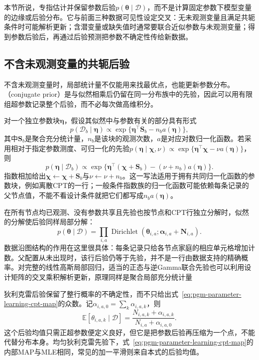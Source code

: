 本节所说，专指估计并保留参数后验$p(\bm{\theta}\mid\mathcal{D})$，而不是计算固定参数下模型变量的边缘或后验分布。它与前面三种数据可见性设定交叉：无未观测变量且满足共轭条件时可能解析更新；含潜变量或缺失值时通常要联合近似参数与未观测变量；得到参数后验后，再通过后验预测把参数不确定性传给新数据。

\subsection{不含未观测变量的共轭后验}
\label{sec:pgm-parameter-learning-conjugacy}

不含未观测变量时，局部统计量不仅能用来找最优点，也能更新参数分布。（conjugate prior）是与似然相乘后仍留在同一分布族中的先验，因此可以用有限组超参数记录整个后验，而不必每次做高维积分。

对一个独立参数块$\bm{\eta}$，假设其似然中与参数有关的部分具有形式
\[
  p(\mathcal{D}_b\mid\bm{\eta})
  \propto\exp\{\bm{\eta}^\top\bm{S}_b-n_ba(\bm{\eta})\},
\]
其中$\bm{S}_b$是聚合充分统计量，$n_b$是该块的观测次数，$a$是对应对数归一化函数。若采用相对于指定参数测度、可归一化的先验$p(\bm{\eta}\mid\bm{\chi},\nu)\propto\exp\{\bm{\eta}^\top\bm{\chi}-\nu a(\bm{\eta})\}$，则
\begin{equation}
  p(\bm{\eta}\mid\mathcal{D}_b)
  \propto
  \exp\{\bm{\eta}^\top(\bm{\chi}+\bm{S}_b)
                 -(\nu+n_b)a(\bm{\eta})\}.
  \label{eq:pgm-parameter-learning-conjugate-update}
\end{equation}
指数相加给出$\bm{\chi}\leftarrow\bm{\chi}+\bm{S}_b$与$\nu\leftarrow\nu+n_b$。这一写法适用于拥有共同归一化函数的参数块，例如离散CPT的一行；一般条件指数族的归一化函数可能依赖每条记录的父节点值，不能不看设计条件就把它们都写成$n_ba(\bm{\eta})$。

在所有节点均已观测、没有参数共享且先验也按节点和CPT行独立分解时，似然的分解使后验同样局部分解：
\begin{equation}
  p(\bm{\theta}\mid\mathcal{D})
   =\prod_{i,a}
     \operatorname{Dirichlet}
       (\bm{\theta}_{i,a};
        \bm{\alpha}_{i,a}+\bm{N}_{i,a}).
  \label{eq:pgm-parameter-learning-local-posterior}
\end{equation}
数据沿图结构的作用在这里很具体：每条记录只给各节点家庭的相应单元格增加计数。父配置从未出现时，该行后验仍等于先验，并不是一行由数据支持的精确概率。对完整的线性高斯局部回归，适当的正态与逆Gamma联合先验也可以利用设计矩阵的交叉乘积解析更新，原理同样是聚合局部充分统计量

狄利克雷后验保留了整行概率的不确定性，而不只给出式~\eqref{eq:pgm-parameter-learning-cpt-map}的众数。记$\alpha_{i,a,0}=\sum_k\alpha_{i,a,k}$，则
\begin{equation}
  \mathbb{E}[\theta_{i,a,k}\mid\mathcal{D}]
    =\frac{N_{i,a,k}+\alpha_{i,a,k}}
            {N_{i,a}+\alpha_{i,a,0}}.
  \label{eq:pgm-parameter-learning-dirichlet-estimates}
\end{equation}
这个后验均值只需正超参数便定义良好，但它是把参数后验再压缩为一个点，不能代替分布本身。均匀狄利克雷先验下，式~\eqref{eq:pgm-parameter-learning-cpt-map}的内部MAP与MLE相同，常见的加一平滑则来自本式的后验均值。

